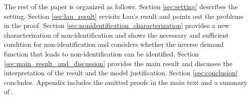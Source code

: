 \documentclass[11pt, a4paper]{article}
\theoremstyle{remark}
\begin{document}
The rest of the paper is organized as follows.
Section \ref{sec:setting} describes the setting.
Section \ref{sec:lau_result} revisits Lau's result and points out the problems in the proof.
Section \ref{sec:nonidentification_characterization} provides a new characterization of non-identification and shows the necessary and sufficient condition for non-identification and considers whether the inverse demand function that leads to non-identification can be identified.
Section \ref{sec:main_result_and_discussion} provides the main result and discusses the interpretation of the result and the model justification.
Section \ref{sec:conclusion} concludes.
Appendix includes the omitted proofs in the main text and a summary of \citet{goldmanNote1964}.






\end{document}
